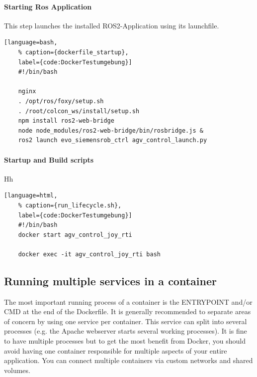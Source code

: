 \paragraph{Starting Ros Application} This step launches the installed ROS2-Application using its launchfile.
\begin{lstlisting}[language=bash,
	% caption={dockerfile_startup}, 
	label={code:DockerTestumgebung}]
	#!/bin/bash

	nginx
	. /opt/ros/foxy/setup.sh
	. /root/colcon_ws/install/setup.sh
	npm install ros2-web-bridge
	node node_modules/ros2-web-bridge/bin/rosbridge.js &
	ros2 launch evo_siemensrob_ctrl agv_control_launch.py 
\end{lstlisting}

\paragraph{Startup and Build scripts} Hh


\begin{lstlisting}[language=html,
	% caption={run_lifecycle.sh}, 
	label={code:DockerTestumgebung}]
	#!/bin/bash
	docker start agv_control_joy_rti

	docker exec -it agv_control_joy_rti bash 
\end{lstlisting}

\subsection{Running multiple services in a container}
The most important running process of a container is the ENTRYPOINT and/or CMD at the end of the Dockerfile. It is generally recommended to separate areas of concern by using one service per container. This service can split into several processes (e.g. the Apache webserver starts several working processes). It is fine to have multiple processes but to get the most benefit from Docker, you should avoid having one container responsible for multiple aspects of your entire application. You can connect multiple containers via custom networks and shared volumes.

